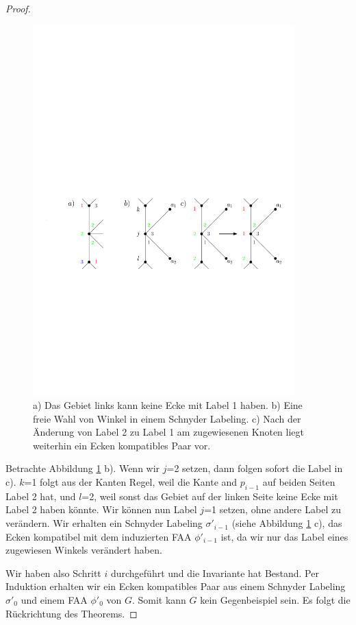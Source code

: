 \begin{proof}
\begin{figure}[h]
	\centering
	  \includegraphics[width=0.9\textwidth]{lem6_5.pdf}
    	\caption{a) Das Gebiet links kann keine Ecke mit Label 1 haben. b) Eine freie Wahl von Winkel in einem Schnyder Labeling. c) Nach der Änderung von Label 2 zu Label 1 am zugewiesenen Knoten liegt weiterhin ein Ecken kompatibles Paar vor.}
    	\label{pic_lem6_5}
\end{figure}

Betrachte Abbildung \ref{pic_lem6_5} b). Wenn wir $j$=2 setzen, dann folgen sofort die Label in c). $k$=1 folgt aus der Kanten Regel, weil die Kante and $p_{i-1}$ auf beiden Seiten Label 2 hat, und $l$=2, weil sonst das Gebiet auf der linken Seite keine Ecke mit Label 2 haben könnte. Wir können nun Label $j$=1 setzen, ohne andere Label zu verändern. Wir erhalten ein Schnyder Labeling $\sigma'_{i-1}$ (siehe Abbildung \ref{pic_lem6_5} c), das Ecken kompatibel mit dem induzierten FAA $\phi'_{i-1}$ ist, da wir nur das Label eines zugewiesen Winkels verändert haben.

Wir haben also Schritt $i$ durchgeführt und die Invariante hat Bestand. Per Induktion erhalten wir ein Ecken kompatibles Paar aus einem Schnyder Labeling $\sigma'_0$ und einem FAA $\phi'_0$ von $G$. Somit kann $G$ kein Gegenbeispiel sein. Es folgt die Rückrichtung des Theorems.
\end{proof}

